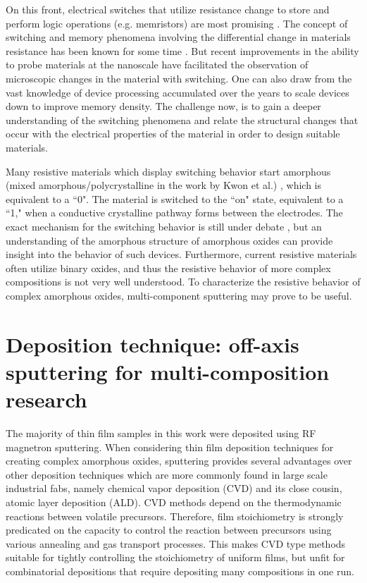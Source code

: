 On this front, electrical switches that utilize resistance change to store and perform logic operations (e.g. memristors) are most promising \cite{Yang2013}. The concept of switching and memory phenomena involving the differential change in materials resistance has been known for some time \cite{Dearnaley1970}. But recent improvements in the ability to probe materials at the nanoscale have facilitated the observation of microscopic changes in the material with switching. One can also draw from the vast knowledge of device processing accumulated over the years to scale devices down to improve memory density. The challenge now, is to gain a deeper understanding of the switching phenomena and relate the structural changes that occur with the electrical properties of the material in order to design suitable materials. 

Many resistive materials which display switching behavior start amorphous (mixed amorphous/polycrystalline in the work by Kwon et al.) \cite{Yao2010a, Kwon2010a, Lee2011a}, which is equivalent to a ``0".  The material is switched to the ``on" state, equivalent to a ``1," when a conductive crystalline pathway forms between the electrodes. The exact mechanism for the switching behavior is still under debate \cite{Yang2013}, but an understanding of the amorphous structure of amorphous oxides can provide insight into the behavior of such devices. Furthermore, current resistive materials often utilize binary oxides, and thus the resistive behavior of more complex compositions is not very well understood. To characterize the resistive behavior of complex amorphous oxides, multi-component sputtering may prove to be useful. 

\section{Deposition technique: off-axis sputtering for multi-composition research}

The majority of thin film samples in this work were deposited using RF magnetron sputtering. When considering thin film deposition techniques for creating complex amorphous oxides, sputtering provides several advantages over other deposition techniques which are more commonly found in large scale industrial fabs, namely chemical vapor deposition (CVD) and its close cousin, atomic layer deposition (ALD). CVD methods depend on the thermodynamic reactions between volatile precursors. Therefore, film stoichiometry is strongly predicated on the capacity to control the reaction between precursors using various annealing and gas transport processes. This makes CVD type methods suitable for tightly controlling the stoichiometry of uniform films, but unfit for combinatorial depositions that require depositing many compositions in one run. 

